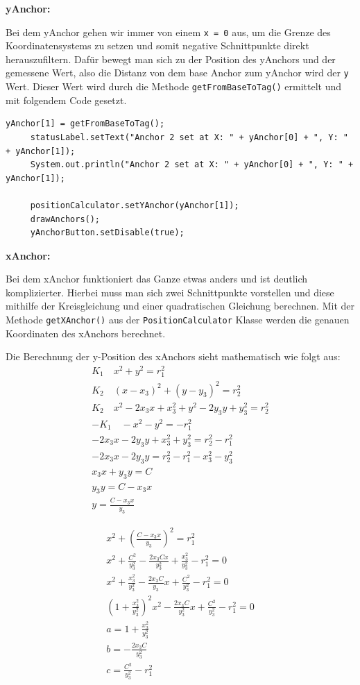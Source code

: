 \textbf{yAnchor:}

Bei dem yAnchor gehen wir immer von einem \texttt{x = 0} aus, um die Grenze des Koordinatensystems zu setzen und somit negative Schnittpunkte direkt herauszufiltern. Dafür bewegt man sich zu der Position des yAnchors und der gemessene Wert, also die Distanz von dem base Anchor zum yAnchor wird der \texttt{y} Wert. Dieser Wert wird durch die Methode \texttt{getFromBaseToTag()} ermittelt und mit folgendem Code gesetzt.
\begin{lstlisting}[style=Java, caption=Berechnung yAnchor, captionpos=b]
     yAnchor[1] = getFromBaseToTag();
     statusLabel.setText("Anchor 2 set at X: " + yAnchor[0] + ", Y: " + yAnchor[1]);
     System.out.println("Anchor 2 set at X: " + yAnchor[0] + ", Y: " + yAnchor[1]);
     
     positionCalculator.setYAnchor(yAnchor[1]);
     drawAnchors();
     yAnchorButton.setDisable(true);
\end{lstlisting}

\newpage
\textbf{xAnchor:}

Bei dem xAnchor funktioniert das Ganze etwas anders und ist deutlich komplizierter. Hierbei muss man sich zwei Schnittpunkte vorstellen und diese mithilfe der Kreisgleichung und einer quadratischen Gleichung berechnen. Mit der Methode \texttt{getXAnchor()} aus der \texttt{PositionCalculator} Klasse werden die genauen Koordinaten des xAnchors berechnet.

Die Berechnung der y-Position des xAnchors sieht mathematisch wie folgt aus:
\begin{gather*}
	K_1 \quad x^2 + y^2 = r_{1}^{2} \\
	K_2 \quad (x - x_{3})^2 + (y - y_{3})^2 = r_{2}^{2} \\
	K_2 \quad x^2 - 2x_{3}x + x_{3}^{2} + y^2 - 2y_{3}y + y_{3}^{2} = r_{2}^{2} \\
	-K_1 \quad -x^2 - y^2 = -r_{1}^{2} \\
	-2x_{3}x - 2y_{3}y + x_{3}^{2} + y_{3}^{2} = r_{2}^{2} - r_{1}^{2} \\
	-2x_{3}x - 2y_{3}y = r_{2}^{2} - r_{1}^{2} - x_{3}^{2} - y_{3}^{2} \\
	x_{3}x + y_{3}y = C \\
	y_{3}y = C - x_{3}x \\
	y = \frac{C - x_{3}x}{y_{3}}
\end{gather*}

\begin{gather*}
	x^2 + \left( \frac{C - x_3 x}{y_3} \right)^2 = r_1^2 \\
	x^2 + \frac{C^2}{y_3^2} - \frac{2x_3 Cx}{y_3^2} + \frac{x_3^2}{y_3^2} - r_1^2 = 0 \\
	x^2 + \frac{x_3^2}{y_3^2} - \frac{2x_3 C}{y_3}x + \frac{C^2}{y_3^2} - r_1^2 = 0\\
	\left( 1 + \frac{x_3^2}{y_3^2} \right)^2x^2 - \frac{2x_3 C}{y_3^2}x + \frac{C^2}{y_3^2} - r_1^2 = 0 \\
	a = 1 + \frac{x_3^2}{y_3^2} \\
	b = -\frac{2x_3 C}{y_3^2} \\
	c = \frac{C^2}{y_3^2} - r_1^2
\end{gather*}

